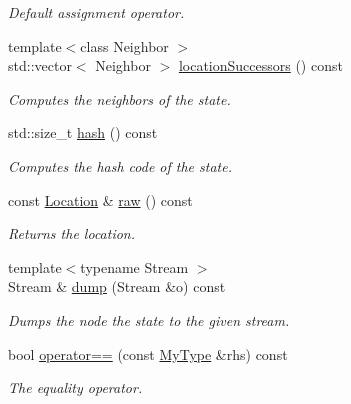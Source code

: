 \begin{DoxyCompactItemize}
\begin{DoxyCompactList}\small\item\em Default assignment operator. \end{DoxyCompactList}\item 
{\footnotesize template$<$class Neighbor $>$ }\\std\+::vector$<$ Neighbor $>$ \hyperlink{structslb_1_1core_1_1sb_1_1ExplicitState_ae4fddaedd8936221f4c92dd5607e5d2b}{location\+Successors} () const 
\begin{DoxyCompactList}\small\item\em Computes the neighbors of the state. \end{DoxyCompactList}\item 
std\+::size\+\_\+t \hyperlink{structslb_1_1core_1_1sb_1_1ExplicitState_a982d9c77e71b3d0e64c0b41d422fa32f}{hash} () const 
\begin{DoxyCompactList}\small\item\em Computes the hash code of the state. \end{DoxyCompactList}\item 
const \hyperlink{structslb_1_1core_1_1sb_1_1ExplicitState_a0db984d44f46c477a6df3c9b062925f9}{Location} \& \hyperlink{structslb_1_1core_1_1sb_1_1ExplicitState_ac75620076983d8d35de370bdb0ce1f96}{raw} () const 
\begin{DoxyCompactList}\small\item\em Returns the location. \end{DoxyCompactList}\item 
{\footnotesize template$<$typename Stream $>$ }\\Stream \& \hyperlink{structslb_1_1core_1_1sb_1_1ExplicitState_ac9f4d6972a1437dd41b74a4608438310}{dump} (Stream \&o) const 
\begin{DoxyCompactList}\small\item\em Dumps the node the state to the given stream. \end{DoxyCompactList}\item 
bool \hyperlink{structslb_1_1core_1_1sb_1_1ExplicitState_ac7e19ab8c118d1c28e45a2848bdb1cf5}{operator==} (const \hyperlink{structslb_1_1core_1_1sb_1_1ExplicitState_ac92f2c174f45d0fd4276916906b4e8b7}{My\+Type} \&rhs) const 
\begin{DoxyCompactList}\small\item\em The equality operator. \end{DoxyCompactList}\end{DoxyCompactItemize}
